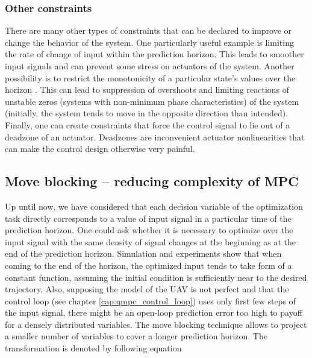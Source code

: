 \subsubsection{Other constraints}

There are many other types of constraints that can be declared to improve or change the behavior of the system. One particularly useful example is limiting the rate of change of input within the prediction horizon. This leads to smoother input signals and can prevent some stress on actuators of the system. Another possibility is to restrict the monotonicity of a particular state's values over the horizon \citep{rossiter2013mpcpracticalapproach}. This can lead to suppression of overshoots and limiting reactions of unstable zeros (systems with non-minimum phase characteristics) of the system (initially, the system tends to move in the opposite direction than intended). Finally, one can create constraints that force the control signal to lie out of a deadzone of an actuator. Deadzones are inconvenient actuator nonlinearities that can make the control design otherwise very painful.

\subsection{Move blocking -- reducing complexity of MPC}

Up until now, we have considered that each decision variable of the optimization task directly corresponds to a value of input signal in a particular time of the prediction horizon. One could ask whether it is necessary to optimize over the input signal with the same density of signal changes at the beginning as at the end of the prediction horizon. Simulation and experiments show that when coming to the end of the horizon, the optimized input tends to take form of a constant function, assuming the initial condition is sufficiently near to the desired trajectory. Also, supposing the model of the UAV is not perfect and that the control loop (see chapter \ref{cap:qmpc_control_loop}) uses only first few steps of the input signal, there might be an open-loop prediction error too high to payoff for a densely distributed variables. The move blocking technique allows to project a smaller number of variables to cover a longer prediction horizon. The transformation is denoted by following equation

